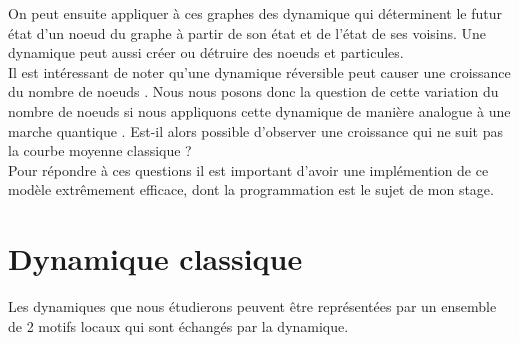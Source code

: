 \documentclass[11pts,french]{article}
\begin{document}
On peut ensuite appliquer à ces graphes des dynamique qui déterminent le futur état d'un noeud du graphe à partir de son état et de l'état de ses voisins. Une dynamique peut aussi créer ou détruire des noeuds et particules. \\

Il est intéressant de noter qu'une dynamique réversible peut causer une croissance du nombre de noeuds \cite{meyer1}. Nous nous posons donc la question de cette variation du nombre de noeuds si nous appliquons cette dynamique de manière analogue à une marche quantique \cite{meyer2}. Est-il alors possible d'observer une croissance qui ne suit pas la courbe moyenne classique ? \\

Pour répondre à ces questions il est important d'avoir une implémention de ce modèle extrêmement efficace, dont la programmation est le sujet de mon stage.

\section{ Dynamique classique }

Les dynamiques que nous étudierons peuvent être représentées par un ensemble de 2 motifs locaux qui sont échangés par la dynamique.
\end{document}
